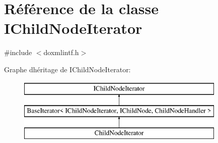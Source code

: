\hypertarget{class_i_child_node_iterator}{}\section{Référence de la classe I\+Child\+Node\+Iterator}
\label{class_i_child_node_iterator}


{\ttfamily \#include $<$doxmlintf.\+h$>$}

Graphe d\textquotesingle{}héritage de I\+Child\+Node\+Iterator\+:\begin{figure}[H]
\begin{center}
\leavevmode
\includegraphics[height=3.000000cm]{class_i_child_node_iterator}
\end{center}
\end{figure}
